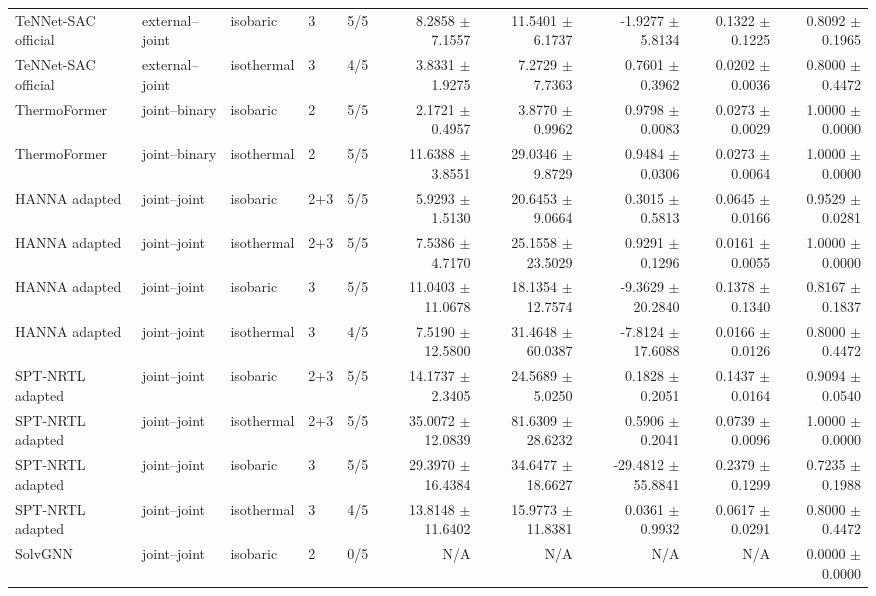 \begin{tabular}{lllllrrrrr}
TeNNet-SAC official & external--joint & isobaric & 3 & 5/5 & 8.2858 $\pm$ 7.1557 & 11.5401 $\pm$ 6.1737 & -1.9277 $\pm$ 5.8134 & 0.1322 $\pm$ 0.1225 & 0.8092 $\pm$ 0.1965 \\
TeNNet-SAC official & external--joint & isothermal & 3 & 4/5 & 3.8331 $\pm$ 1.9275 & 7.2729 $\pm$ 7.7363 & 0.7601 $\pm$ 0.3962 & 0.0202 $\pm$ 0.0036 & 0.8000 $\pm$ 0.4472 \\
ThermoFormer & joint--binary & isobaric & 2 & 5/5 & 2.1721 $\pm$ 0.4957 & 3.8770 $\pm$ 0.9962 & 0.9798 $\pm$ 0.0083 & 0.0273 $\pm$ 0.0029 & 1.0000 $\pm$ 0.0000 \\
ThermoFormer & joint--binary & isothermal & 2 & 5/5 & 11.6388 $\pm$ 3.8551 & 29.0346 $\pm$ 9.8729 & 0.9484 $\pm$ 0.0306 & 0.0273 $\pm$ 0.0064 & 1.0000 $\pm$ 0.0000 \\
HANNA adapted & joint--joint & isobaric & 2+3 & 5/5 & 5.9293 $\pm$ 1.5130 & 20.6453 $\pm$ 9.0664 & 0.3015 $\pm$ 0.5813 & 0.0645 $\pm$ 0.0166 & 0.9529 $\pm$ 0.0281 \\
HANNA adapted & joint--joint & isothermal & 2+3 & 5/5 & 7.5386 $\pm$ 4.7170 & 25.1558 $\pm$ 23.5029 & 0.9291 $\pm$ 0.1296 & 0.0161 $\pm$ 0.0055 & 1.0000 $\pm$ 0.0000 \\
HANNA adapted & joint--joint & isobaric & 3 & 5/5 & 11.0403 $\pm$ 11.0678 & 18.1354 $\pm$ 12.7574 & -9.3629 $\pm$ 20.2840 & 0.1378 $\pm$ 0.1340 & 0.8167 $\pm$ 0.1837 \\
HANNA adapted & joint--joint & isothermal & 3 & 4/5 & 7.5190 $\pm$ 12.5800 & 31.4648 $\pm$ 60.0387 & -7.8124 $\pm$ 17.6088 & 0.0166 $\pm$ 0.0126 & 0.8000 $\pm$ 0.4472 \\
SPT-NRTL adapted & joint--joint & isobaric & 2+3 & 5/5 & 14.1737 $\pm$ 2.3405 & 24.5689 $\pm$ 5.0250 & 0.1828 $\pm$ 0.2051 & 0.1437 $\pm$ 0.0164 & 0.9094 $\pm$ 0.0540 \\
SPT-NRTL adapted & joint--joint & isothermal & 2+3 & 5/5 & 35.0072 $\pm$ 12.0839 & 81.6309 $\pm$ 28.6232 & 0.5906 $\pm$ 0.2041 & 0.0739 $\pm$ 0.0096 & 1.0000 $\pm$ 0.0000 \\
SPT-NRTL adapted & joint--joint & isobaric & 3 & 5/5 & 29.3970 $\pm$ 16.4384 & 34.6477 $\pm$ 18.6627 & -29.4812 $\pm$ 55.8841 & 0.2379 $\pm$ 0.1299 & 0.7235 $\pm$ 0.1988 \\
SPT-NRTL adapted & joint--joint & isothermal & 3 & 4/5 & 13.8148 $\pm$ 11.6402 & 15.9773 $\pm$ 11.8381 & 0.0361 $\pm$ 0.9932 & 0.0617 $\pm$ 0.0291 & 0.8000 $\pm$ 0.4472 \\
SolvGNN & joint--joint & isobaric & 2 & 0/5 & N/A & N/A & N/A & N/A & 0.0000 $\pm$ 0.0000 \\

\end{tabular}
